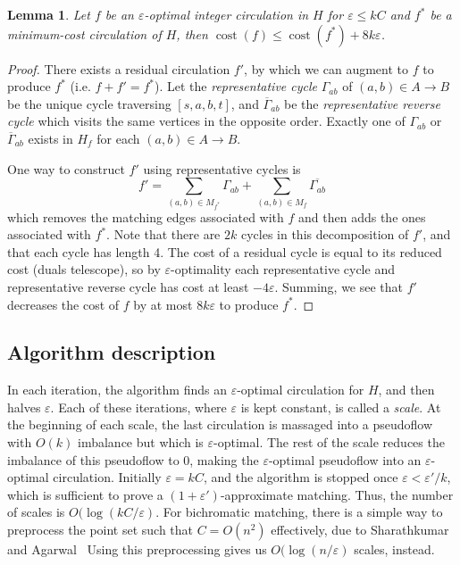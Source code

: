 \documentclass[11pt]{article}
\def\eps{\varepsilon}
\theoremstyle{plain}
\newtheorem{lemma}{Lemma}
\def\cost{\operatorname{cost}}
\begin{document}
\begin{lemma}
\label{lemma:eps-opt_approx}
	Let $f$ be an $\eps$-optimal integer circulation in $H$ for 
	$\eps \leq kC$ and $f^*$ be a minimum-cost circulation of $H$, then 
	$\cost(f) \leq \cost(f^*) + 8k\eps$.
\end{lemma}
\begin{proof}
	There exists a residual circulation $f'$, by which we can augment to
	$f$ to produce $f^*$ (i.e. $f + f' = f^*$).
	Let the \emph{representative cycle} $\Gamma_{ab}$ of 
	$(a, b) \in A \to B$ be the unique cycle traversing $[s, a, b, t]$,
	and $\overline{\Gamma}_{ab}$ be the \emph{representative reverse cycle} 
	which visits the same vertices in the opposite order.
	Exactly one of $\Gamma_{ab}$ or $\overline{\Gamma}_{ab}$ exists in 
	$H_f$ for each $(a, b) \in A \to B$.

	One way to construct $f'$ using representative cycles is
	\begin{equation*}
		f' = \sum_{(a, b) \in M_{f^*}} \Gamma_{ab} + \sum_{(a, b) \in M_f} \overline{\Gamma_{ab}}
	\end{equation*}
	which removes the matching edges associated with $f$ and then adds the 
	ones associated with $f^*$.
	Note that there are $2k$ cycles in this decomposition of $f'$, and 
	that each cycle has length 4.
	The cost of a residual cycle is equal to its reduced cost (duals 
	telescope), so by $\eps$-optimality each representative cycle and
	representative reverse cycle has cost at least $-4\eps$.
	Summing, we see that $f'$ decreases the cost of $f$ by at most 
	$8k\eps$ to produce $f^*$.
\end{proof}

\subsection{Algorithm description}




In each iteration, the algorithm finds an $\eps$-optimal circulation for $H$,
and then halves $\eps$.
Each of these iterations, where $\eps$ is kept constant, is called a 
\emph{scale}.
At the beginning of each scale, the last circulation is massaged into a 
pseudoflow with $O(k)$ imbalance but which is $\eps$-optimal.
The rest of the scale reduces the imbalance of this pseudoflow to 0, making
the $\eps$-optimal pseudoflow into an $\eps$-optimal circulation.
Initially $\eps = kC$, and the algorithm is stopped once $\eps < \eps'/k$,
which is sufficient to prove a $(1 + \eps')$-approximate matching.
Thus, the number of scales is $O(\log(kC/\eps)$.
For bichromatic matching, there is a simple way to preprocess the point set 
such that $C = O(n^2)$ effectively, due to Sharathkumar and Agarwal~%
Using this preprocessing gives us $O(\log(n/\eps)$ scales, instead.
\end{document}
